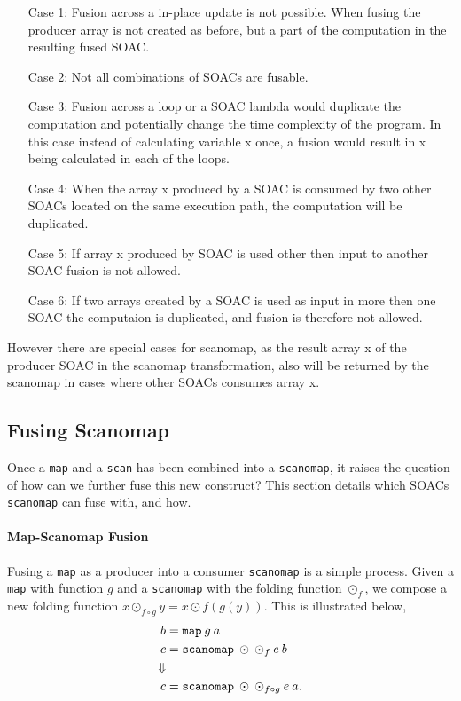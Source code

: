 \documentclass[11pt]{article}
\begin{document}
\begin{itemize}
\item[Case 1:] Fusion across a in-place update is not possible. When fusing the producer array is not created as before, but a part of the computation in the resulting fused SOAC.
\item[Case 2:] Not all combinations of SOACs are fusable.
\item[Case 3:] Fusion across a loop or a SOAC lambda would duplicate the computation and potentially change the time complexity of the program. In this case instead of calculating variable x once, a fusion would result in x being calculated in each of the loops. 
\item[Case 4:] When the array x produced by a SOAC is consumed by two other SOACs located on the same execution path, the computation will be duplicated.
\item[Case 5:] If array x produced by SOAC is used other then input to another SOAC fusion is not allowed.
\item[Case 6:] If two arrays created by a SOAC is used as input in more then one SOAC the computaion is duplicated, and fusion is therefore not allowed.
\end{itemize}

However there are special cases for scanomap, as the result array x of the producer SOAC in the scanomap transformation, also will be returned by the scanomap in cases where other SOACs consumes array x.


\subsection{Fusing Scanomap}
Once a \texttt{map} and a \texttt{scan} has been combined into a \texttt{scanomap}, it raises the question of how can we further fuse this new construct?
 This section details which SOACs \texttt{scanomap} can fuse with, and how.
\paragraph{Map-Scanomap Fusion}
Fusing a \texttt{map} as a producer into a consumer \texttt{scanomap} is a simple process. Given a \texttt{map} with function $g$ and a 
 \texttt{scanomap} with the folding function $\odot_f$, we compose a new folding function $x \odot_{f \circ g} y = x \odot f (g (y))$. This is illustrated below,
\begin{align*}
  b &= \mathtt{map} \: g \: a \\
  c &= \mathtt{scanomap} \: \odot \: \odot_f \: e \: b \\
\Downarrow \\
  c &= \mathtt{scanomap} \: \odot \: \odot_{f\circ g} \: e \: a\mathnormal{.}
\end{align*}
\end{document}
